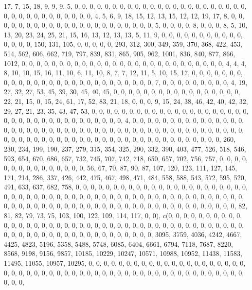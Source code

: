 \documentclass[
]{article}
\begin{document}
17, 7, 15, 18, 9, 9, 9, 5, 0, 0, 0, 0, 0, 0, 0, 0, 0, 0, 0, 0, 0, 0, 0,
0, 0, 0, 0, 0, 0, 0, 0, 0, 0, 0, 0, 0, 0, 0, 0, 0, 0, 0, 0, 4, 5, 6, 9,
18, 15, 12, 13, 15, 12, 12, 19, 17, 8, 0, 0, 0, 0, 0, 0, 0, 0, 0, 0, 0,
0, 0, 0, 0, 0, 0, 0, 0, 0, 0, 0, 5, 0, 0, 0, 0, 8, 0, 0, 0, 8, 5, 10,
13, 20, 23, 24, 25, 21, 15, 16, 13, 12, 13, 13, 5, 11, 9, 0, 0, 0, 0, 0,
0, 0, 0, 0, 0, 0, 0, 0, 0, 0, 150, 131, 105, 0, 0, 0, 0, 0, 293, 312,
300, 349, 359, 370, 368, 422, 453, 514, 562, 606, 662, 719, 797, 839,
831, 865, 905, 962, 1001, 836, 840, 877, 866, 1012, 0, 0, 0, 0, 0, 0, 0,
0, 0, 0, 0, 0, 0, 0, 0, 0, 0, 0, 0, 0, 0, 0, 0, 0, 0, 0, 0, 4, 4, 4, 8,
10, 10, 15, 16, 11, 10, 6, 11, 10, 8, 7, 7, 12, 11, 5, 10, 15, 17, 0, 0,
0, 0, 0, 0, 0, 0, 0, 0, 0, 0, 0, 0, 0, 0, 0, 0, 0, 0, 0, 0, 0, 0, 0, 0,
0, 7, 0, 0, 0, 0, 0, 0, 0, 0, 0, 4, 19, 27, 32, 27, 53, 45, 39, 30, 45,
40, 45, 0, 0, 0, 0, 0, 0, 0, 0, 0, 0, 0, 0, 0, 0, 0, 0, 0, 22, 21, 15,
0, 15, 24, 61, 17, 52, 83, 21, 18, 0, 0, 0, 9, 15, 24, 38, 46, 42, 40,
42, 32, 29, 27, 21, 23, 35, 43, 47, 53, 0, 0, 0, 0, 0, 0, 0, 0, 0, 0, 0,
0, 0, 0, 0, 0, 0, 0, 0, 0, 0, 0, 0, 0, 0, 0, 0, 0, 0, 0, 0, 0, 0, 0, 0,
0, 0, 4, 0, 0, 0, 0, 0, 0, 0, 0, 0, 0, 0, 0, 0, 0, 0, 0, 0, 0, 0, 0, 0,
0, 0, 0, 0, 0, 0, 0, 0, 0, 0, 0, 0, 0, 0, 0, 0, 0, 0, 0, 0, 0, 0, 0, 0,
0, 0, 0, 0, 0, 0, 0, 0, 0, 0, 0, 0, 0, 0, 0, 0, 0, 0, 0, 0, 0, 0, 0, 0,
0, 0, 0, 0, 0, 0, 0, 260, 230, 234, 199, 190, 237, 279, 315, 354, 325,
290, 332, 390, 403, 477, 526, 518, 546, 593, 654, 670, 686, 657, 732,
745, 707, 742, 718, 650, 657, 702, 756, 757, 0, 0, 0, 0, 0, 0, 0, 0, 0,
0, 0, 0, 0, 0, 0, 56, 67, 70, 87, 90, 87, 107, 120, 123, 111, 127, 145,
171, 214, 286, 337, 426, 442, 475, 467, 498, 471, 484, 558, 588, 543,
572, 595, 520, 491, 633, 637, 682, 758, 0, 0, 0, 0, 0, 0, 0, 0, 0, 0, 0,
0, 0, 0, 0, 0, 0, 0, 0, 0, 0, 0, 0, 0, 0, 0, 0, 0, 0, 0, 0, 0, 0, 0, 0,
0, 0, 0, 0, 0, 0, 0, 0, 0, 0, 0, 0, 0, 0, 0, 0, 0, 0, 0, 0, 0, 0, 0, 0,
0, 0, 0, 0, 0, 0, 0, 0, 0, 0, 0, 0, 0, 0, 0, 0, 0, 0, 0, 0, 0, 0, 0, 0,
0, 0, 0, 82, 81, 82, 79, 73, 75, 103, 100, 122, 109, 114, 117, 0, 0),
c(0, 0, 0, 0, 0, 0, 0, 0, 0, 0, 0, 0, 0, 0, 0, 0, 0, 0, 0, 0, 0, 0, 0,
0, 0, 0, 0, 0, 0, 0, 0, 0, 0, 0, 0, 0, 0, 0, 0, 0, 0, 0, 0, 0, 0, 0, 0,
0, 0, 0, 0, 0, 0, 0, 0, 0, 0, 0, 0, 0, 0, 0, 3095, 3759, 4036, 4242,
4667, 4425, 4823, 5196, 5358, 5488, 5748, 6085, 6404, 6661, 6794, 7118,
7687, 8220, 8568, 9198, 9156, 9857, 10185, 10229, 10247, 10571, 10988,
10952, 11438, 11583, 11495, 11055, 10957, 10295, 0, 0, 0, 0, 0, 0, 0, 0,
0, 0, 0, 0, 0, 0, 0, 0, 0, 0, 0, 0, 0, 0, 0, 0, 0, 0, 0, 0, 0, 0, 0, 0,
0, 0, 0, 0, 0, 0, 0, 0, 0, 0, 0, 0, 0, 0, 0, 0, 0, 0, 0, 0, 0, 0, 0, 0,
\end{document}
